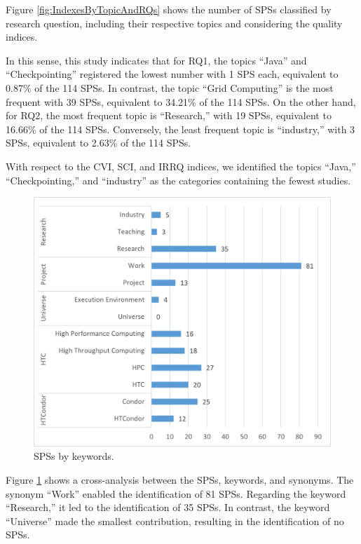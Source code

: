 Figure \ref{fig:IndexesByTopicAndRQs} shows the number of SPSs classified by research question, including their respective topics and considering the quality indices.

In this sense, this study indicates that for RQ1, the topics ``Java'' and ``Checkpointing'' registered the lowest number with 1 SPS each, equivalent to 0.87\% of the 114 SPSs. In contrast, the topic ``Grid Computing'' is the most frequent with 39 SPSs, equivalent to 34.21\% of the 114 SPSs. On the other hand, for RQ2, the most frequent topic is ``Research,'' with 19 SPSs, equivalent to 16.66\% of the 114 SPSs. Conversely, the least frequent topic is ``industry,'' with 3 SPSs, equivalent to 2.63\% of the 114 SPSs.

With respect to the CVI, SCI, and IRRQ indices, we identified the topics ``Java,'' ``Checkpointing,'' and ``industry'' as the categories containing the fewest studies.

\begin{figure}[htbp]
	\centering
	\vspace{10pt}
	\includegraphics[scale=0.7]{resources/figures/SPSsByKeywords.jpg}
	\vspace{6pt}
	\caption{SPSs by keywords.}
	\label{fig:SPSsByKeywords}
\end{figure}

Figure \ref{fig:SPSsByKeywords} shows a cross-analysis between the SPSs, keywords, and synonyms. The synonym ``Work'' enabled the identification of 81 SPSs. Regarding the keyword ``Research,'' it led to the identification of 35 SPSs. In contrast, the keyword ``Universe'' made the smallest contribution, resulting in the identification of no SPSs.

